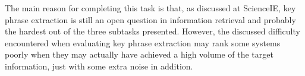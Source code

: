 The main reason for completing this task is that, as discussed at ScienceIE, key phrase extraction is still an open question in information retrieval and probably the hardest out of the three subtasks presented. However, the discussed difficulty encountered when evaluating key phrase extraction may rank some systems poorly when they may actually have achieved a high volume of the target information, just with some extra noise in addition.
